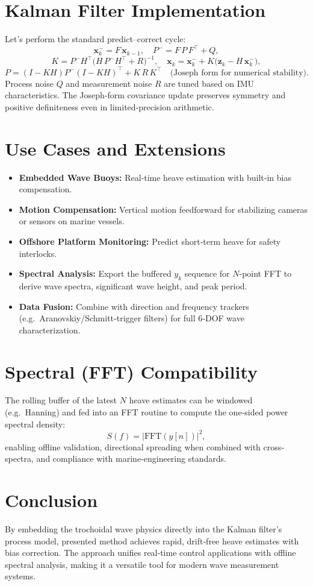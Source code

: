 \documentclass[12pt,letterpaper]{article}
\begin{document}
\section{Kalman Filter Implementation}
Let's perform the standard predict–correct cycle:
\[
\mathbf{x}_k^- = F\,\mathbf{x}_{k-1},\quad
P^- = F\,P\,F^\top + Q,
\]
\[
K = P^-H^\top\bigl(H\,P^-H^\top+R\bigr)^{-1},
\quad
\mathbf{x}_k = \mathbf{x}_k^- + K\bigl(\mathbf{z}_k - H\,\mathbf{x}_k^-\bigr),
\]
\[
P = (I-KH)P^-(I-KH)^\top + K\,R\,K^\top
\quad\text{(Joseph form for numerical stability).}
\]
Process noise \(Q\) and measurement noise \(R\) are tuned based on IMU characteristics.  The Joseph‐form covariance update preserves symmetry and positive definiteness even in limited‐precision arithmetic.

\section{Use Cases and Extensions}
\begin{itemize}
  \item \textbf{Embedded Wave Buoys:} Real‐time heave estimation with built‐in bias compensation.
  \item \textbf{Motion Compensation:} Vertical motion feedforward for stabilizing cameras or sensors on marine vessels.
  \item \textbf{Offshore Platform Monitoring:} Predict short‐term heave for safety interlocks.
  \item \textbf{Spectral Analysis:} Export the buffered \(y_k\) sequence for \(N\)-point FFT to derive wave spectra, significant wave height, and peak period.
  \item \textbf{Data Fusion:} Combine with direction and frequency trackers (e.g.\ Aranovskiy/Schmitt‐trigger filters) for full 6‐DOF wave characterization.
\end{itemize}

\section{Spectral (FFT) Compatibility}
The rolling buffer of the latest \(N\) heave estimates can be windowed (e.g.\ Hanning) and fed into an FFT routine to compute the one‐sided power spectral density:
\[
S(f) = \bigl|\mathrm{FFT}(y[n])\bigr|^2,
\]
enabling offline validation, directional spreading when combined with cross‐spectra, and compliance with marine‐engineering standards.

\section{Conclusion}
By embedding the trochoidal wave physics directly into the Kalman filter’s process model, presented method achieves rapid, drift‐free heave estimates with bias correction.  The approach unifies real‐time control applications with offline spectral analysis, making it a versatile tool for modern wave measurement systems.
\end{document}
